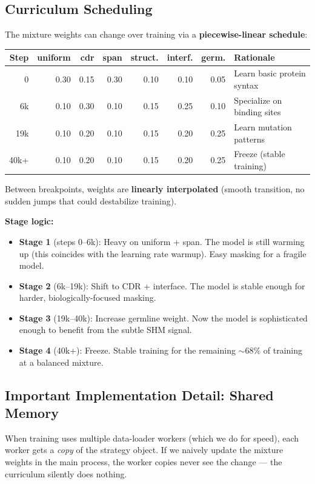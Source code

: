 \documentclass[11pt]{article}
\begin{document}
\subsection{Curriculum Scheduling}
The mixture weights can change over training via a
\textbf{piecewise-linear schedule}:

\begin{center}
\small
\begin{tabular}{@{}r r r r r r r l@{}}
\toprule
Step & uniform & cdr & span & struct. & interf. & germ. & Rationale \\
\midrule
0 & 0.30 & 0.15 & 0.30 & 0.10 & 0.10 & 0.05 & Learn basic protein syntax \\
6k & 0.10 & 0.30 & 0.10 & 0.15 & 0.25 & 0.10 & Specialize on binding sites \\
19k & 0.10 & 0.20 & 0.10 & 0.15 & 0.20 & 0.25 & Learn mutation patterns \\
40k+ & 0.10 & 0.20 & 0.10 & 0.15 & 0.20 & 0.25 & Freeze (stable training) \\
\bottomrule
\end{tabular}
\end{center}

Between breakpoints, weights are \textbf{linearly interpolated}
(smooth transition, no sudden jumps that could destabilize
training).

\textbf{Stage logic:}
\begin{itemize}
\item \textbf{Stage 1} (steps 0--6k): Heavy on uniform + span.
      The model is still warming up (this coincides with the
      learning rate warmup). Easy masking for a fragile model.
\item \textbf{Stage 2} (6k--19k): Shift to CDR + interface.
      The model is stable enough for harder, biologically-focused
      masking.
\item \textbf{Stage 3} (19k--40k): Increase germline weight.
      Now the model is sophisticated enough to benefit from the
      subtle SHM signal.
\item \textbf{Stage 4} (40k+): Freeze. Stable training for the
      remaining $\sim$68\% of training at a balanced mixture.
\end{itemize}

\subsection{Important Implementation Detail: Shared Memory}

When training uses multiple data-loader workers (which we do for
speed), each worker gets a \emph{copy} of the strategy object.
If we naively update the mixture weights in the main process, the
worker copies never see the change --- the curriculum silently
does nothing.
\end{document}
